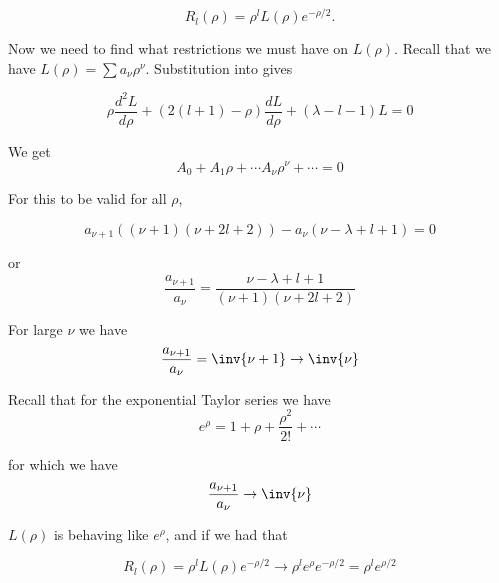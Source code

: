 \begin{equation}\label{eqn:PHY356FLecture10:170}
R_l(\rho) = \rho^l L(\rho) e^{-\rho/2}.
\end{equation}

Now we need to find what restrictions we must have on \(L(\rho)\).  Recall that we have \(L(\rho) = \sum a_\nu \rho^\nu\).  Substitution into  gives

\begin{equation}\label{eqn:PHY356FLecture10:180}
\rho \frac{d^2 L}{d\rho} + \left( 2(l+1) - \rho \right) \frac{d L}{d \rho} + (\lambda - l - 1) L = 0
\end{equation}

We get
\begin{equation}\label{eqn:PHY356FLecture10:190}
A_0 + A_1 \rho + \cdots A_\nu \rho^\nu + \cdots = 0
\end{equation}

For this to be valid for all \(\rho\),

\begin{equation}\label{eqn:PHY356FLecture10:200}
a_{\nu+1} \left(
(\nu+1)(\nu+ 2l + 2)
\right)
-
a_{\nu} \left(
\nu - \lambda + l + 1
\right)
=0
\end{equation}

or
\begin{equation}\label{eqn:PHY356FLecture10:210}
\frac{a_{\nu+1}}{ a_{\nu} }
=
\frac{ \nu - \lambda + l + 1 }{ (\nu+1)(\nu+ 2l + 2) }
\end{equation}

For large \(\nu\) we have
\begin{equation}\label{eqn:PHY356FLecture10:220}
\frac{a_{\nu+1}}{ a_{\nu} }
=
\inv{\nu+1}
\rightarrow \inv{\nu}
\end{equation}

Recall that for the exponential Taylor series we have
\begin{equation}\label{eqn:PHY356FLecture10:230}
e^\rho = 1 + \rho + \frac{\rho^2}{2!} + \cdots
\end{equation}

for which we have
\begin{equation}\label{eqn:PHY356FLecture10:240}
\frac{a_{\nu+1}}{a_\nu} \rightarrow \inv{\nu}
\end{equation}

\(L(\rho)\) is behaving like \(e^\rho\), and if we had that

\begin{equation}\label{eqn:PHY356FLecture10:250}
R_l(\rho) = \rho^l L(\rho) e^{-\rho/2} \rightarrow \rho^l e^\rho e^{-\rho/2} = \rho^l e^{\rho/2}
\end{equation}

